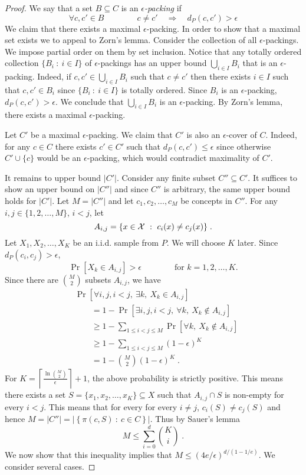 \begin{proof}
We say that a set $B \subseteq C$ is an \emph{$\epsilon$-packing} if
$$
\forall c,c' \in B \qquad \qquad c \neq c' \quad \Longrightarrow \quad d_P(c,c') > \epsilon
$$
We claim that there exists a maximal $\epsilon$-packing. In order to show that a
maximal set exists we to appeal to Zorn's lemma. Consider the collection of all
$\epsilon$-packings. We impose partial order on them by set inclusion. Notice
that any totally ordered collection $\{ B_i ~:~ i \in I \}$ of
$\epsilon$-packings has an upper bound $\bigcup_{i \in I} B_i$ that is an
$\epsilon$-packing. Indeed, if $c,c' \in \bigcup_{i \in I} B_i$ such that $c
\neq c'$ then there exists $i \in I$ such that $c,c' \in B_i$ since $\{ B_i ~:~
i \in I \}$ is totally ordered. Since $B_i$ is an $\epsilon$-packing, $d_P(c,c') >
\epsilon$. We conclude that $\bigcup_{i \in I} B_i$ is an $\epsilon$-packing. By
Zorn's lemma, there exists a maximal $\epsilon$-packing.

Let $C'$ be a maximal $\epsilon$-packing. We claim that $C'$ is also an
$\epsilon$-cover of $C$. Indeed, for any $c \in C$ there exists $c' \in C'$ such
that $d_P(c,c') \le \epsilon$ since otherwise $C' \cup \{c\}$ would be an
$\epsilon$-packing, which would contradict maximality of $C'$.

It remains to upper bound $|C'|$. Consider any finite subset $C'' \subseteq C'$.
It suffices to show an upper bound on $|C''|$ and since $C''$ is arbitrary, the
same upper bound holds for $|C'|$. Let $M = |C''|$ and let $c_1, c_2, \dots,
c_M$ be concepts in $C''$. For any $i,j \in \{1,2,\dots,M\}$, $i < j$, let
$$
A_{i,j} = \{ x \in \mathcal{X} ~:~ c_i(x) \neq c_j(x) \} \; .
$$
Let $X_1, X_2, \dots, X_K$ be an i.i.d. sample from $P$. We will choose $K$ later.
Since $d_P(c_i, c_j) > \epsilon$,
$$
\Pr[X_k \in A_{i,j}] > \epsilon \qquad \qquad \text{for $k=1,2,\dots,K$}.
$$
Since there are $\binom{M}{2}$ subsets $A_{i,j}$, we have
\begin{align*}
& \Pr\left[\forall i,j, i < j, \ \exists k, \ X_k \in A_{i,j} \right] \\
& \qquad = 1 - \Pr\left[\exists i,j, i < j, \ \forall k, \ X_k \not \in A_{i,j} \right] \\
& \qquad \ge 1 - \sum_{1 \le i < j \le M} \Pr\left[\forall k, \ X_k \not \in A_{i,j} \right] \\
& \qquad \ge 1 - \sum_{1 \le i < j \le M} (1 - \epsilon)^K \\
& \qquad = 1 - \binom{M}{2} (1 - \epsilon)^K \; .
\end{align*}
For $K = \left\lceil \frac{\ln \binom{M}{2}}{\epsilon} \right\rceil +
1$, the above probability is strictly positive. This means there exists a set $S =
\{x_1, x_2, \dots, x_K\} \subseteq X$ such that $A_{i,j} \cap S$ is non-empty
for every $i < j$. This means that for every for every $i \neq j$, $c_i(S) \neq
c_j(S)$ and hence $M = |C''| = \left| \left\{ \pi(c, S) ~:~ c \in C \right\} \right|$.
Thus by Sauer's lemma
$$
M \le \sum_{i=0}^d \binom{K}{i} \; .
$$
We now show that this inequality implies that $M \le (4e/\epsilon)^{d/(1-1/e)}$. We consider several cases.


\end{proof}
